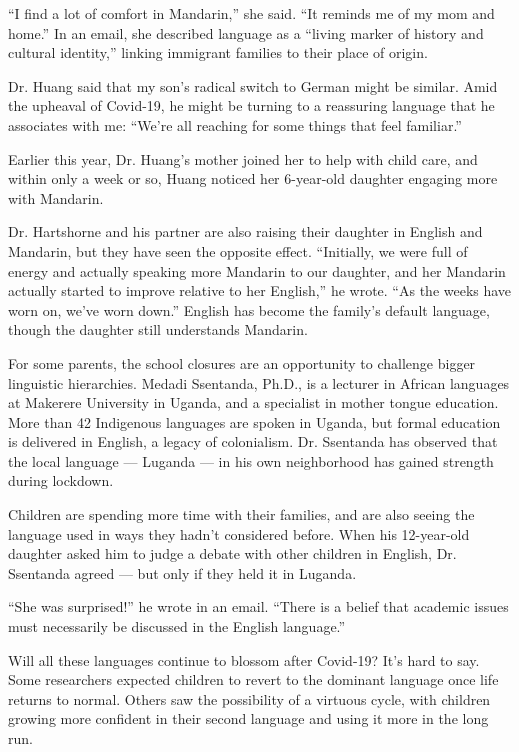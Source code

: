 ``I find a lot of comfort in Mandarin,'' she said. ``It reminds me of my
mom and home.'' In an email, she described language as a ``living marker
of history and cultural identity,'' linking immigrant families to their
place of origin.

Dr. Huang said that my son's radical switch to German might be similar.
Amid the upheaval of Covid-19, he might be turning to a reassuring
language that he associates with me: ``We're all reaching for some
things that feel familiar.''

Earlier this year, Dr. Huang's mother joined her to help with child
care, and within only a week or so, Huang noticed her 6-year-old
daughter engaging more with Mandarin.

Dr. Hartshorne and his partner are also raising their daughter in
English and Mandarin, but they have seen the opposite effect.
``Initially, we were full of energy and actually speaking more Mandarin
to our daughter, and her Mandarin actually started to improve relative
to her English,'' he wrote. ``As the weeks have worn on, we've worn
down.'' English has become the family's default language, though the
daughter still understands Mandarin.

For some parents, the school closures are an opportunity to challenge
bigger linguistic hierarchies. Medadi Ssentanda, Ph.D., is a lecturer in
African languages at Makerere University in Uganda, and a specialist in
mother tongue education. More than 42 Indigenous languages are spoken in
Uganda, but formal education is delivered in English, a legacy of
colonialism. Dr. Ssentanda has observed that the local language ---
Luganda --- in his own neighborhood has gained strength during lockdown.

Children are spending more time with their families, and are also seeing
the language used in ways they hadn't considered before. When his
12-year-old daughter asked him to judge a debate with other children in
English, Dr. Ssentanda agreed --- but only if they held it in Luganda.

``She was surprised!'' he wrote in an email. ``There is a belief that
academic issues must necessarily be discussed in the English language.''

Will all these languages continue to blossom after Covid-19? It's hard
to say. Some researchers expected children to revert to the dominant
language once life returns to normal. Others saw the possibility of a
virtuous cycle, with children growing more confident in their second
language and using it more in the long run.

